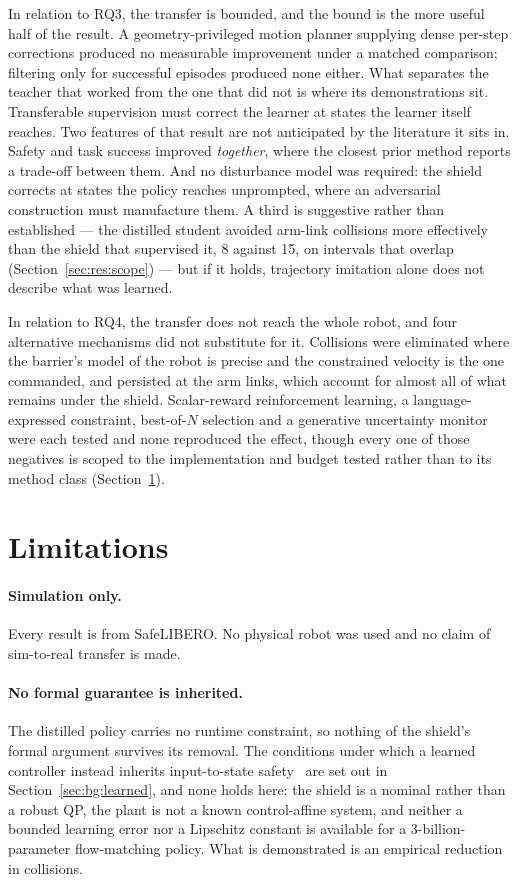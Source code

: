 In relation to RQ3, the transfer is bounded, and the bound is the more useful half of the result. A
geometry-privileged
motion planner supplying dense per-step corrections produced no measurable improvement under a
matched comparison; filtering only for successful episodes produced none either. What separates the
teacher that worked from the one that did not is where its demonstrations sit. Transferable
supervision must correct the learner at states the learner itself reaches. Two features of that
result are not anticipated by the literature it sits in. Safety and task success improved
\emph{together}, where the closest prior method reports a trade-off between them. And no
disturbance model was required: the shield corrects at states the policy reaches unprompted, where
an adversarial construction must manufacture them. A third is suggestive rather than established
--- the distilled student avoided arm-link collisions more effectively than the shield that
supervised it, 8 against 15, on intervals that overlap (Section~\ref{sec:res:scope}) --- but if it
holds, trajectory imitation alone does not describe what was learned.

In relation to RQ4, the transfer does not reach the whole robot, and four alternative mechanisms did
not substitute for it. Collisions were eliminated where the barrier's model of the robot is precise
and the constrained velocity is the one commanded, and persisted at the arm links, which account for
almost all of what remains under the shield. Scalar-reward reinforcement learning, a
language-expressed constraint, best-of-$N$ selection and a generative uncertainty monitor were each
tested and none reproduced the effect, though every one of those negatives is scoped to the
implementation and budget tested rather than to its method class
(Section~\ref{sec:conc:limitations}).

\section{Limitations}\label{sec:conc:limitations}

\paragraph{Simulation only.}
Every result is from SafeLIBERO. No physical robot was used and no claim of sim-to-real transfer is
made.

\paragraph{No formal guarantee is inherited.}
The distilled policy carries no runtime constraint, so nothing of the shield's formal argument
survives its removal. The conditions under which a learned controller instead inherits
input-to-state safety~\cite{cosner2022il_cbf} are set out in Section~\ref{sec:bg:learned}, and none
holds here: the shield is a nominal rather than a robust QP, the plant is not a known
control-affine system, and neither a bounded learning error nor a Lipschitz constant is available
for a 3-billion-parameter flow-matching policy. What is demonstrated is an empirical reduction in
collisions.

